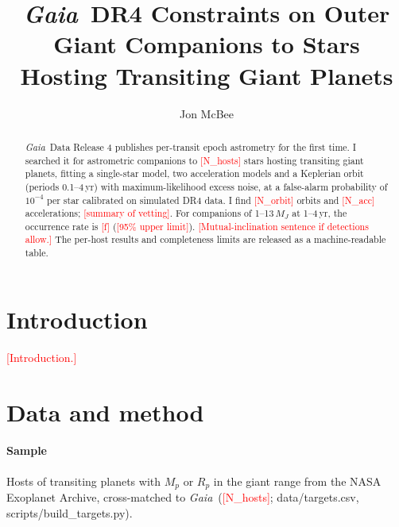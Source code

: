 \documentclass{aastex701}
\newcommand{\XX}[1]{\textcolor{red}{[#1]}}
\newcommand{\gaia}{\textit{Gaia}}
\begin{document}
\title{\gaia\ DR4 Constraints on Outer Giant Companions to Stars Hosting Transiting Giant Planets}

\author[orcid=0009-0000-7524-4470]{Jon McBee}

\begin{abstract}
\gaia\ Data Release 4 publishes per-transit epoch astrometry for the first time. I searched it
for astrometric companions to \XX{N_hosts} stars hosting transiting giant planets, fitting a
single-star model, two acceleration models and a Keplerian orbit (periods 0.1--4\,yr) with
maximum-likelihood excess noise, at a false-alarm probability of $10^{-4}$ per star calibrated on
simulated DR4 data. I find \XX{N_orbit} orbits and \XX{N_acc} accelerations; \XX{summary of
vetting}. For companions of 1--13\,$M_J$ at 1--4\,yr, the occurrence rate is \XX{f} (\XX{95\%
upper limit}). \XX{Mutual-inclination sentence if detections allow.} The per-host results and
completeness limits are released as a machine-readable table.
\end{abstract}

\keywords{\XX{UAT concepts}}

\section{Introduction}
\XX{Introduction.}

\section{Data and method} \label{sec:method}
\paragraph{Sample}
Hosts of transiting planets with $M_p$ or $R_p$ in the giant range from the NASA Exoplanet
Archive, cross-matched to \gaia\ (\XX{N_hosts}; data/targets.csv, scripts/build_targets.py).
\end{document}
